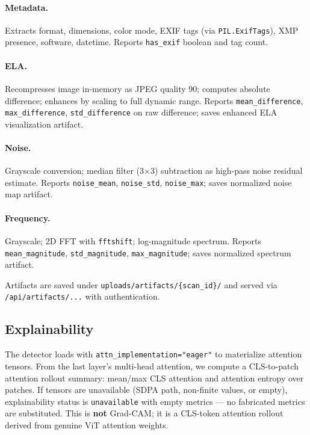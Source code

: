 \documentclass[10pt,conference,compsoc]{IEEEtran}
\begin{document}
\paragraph{Metadata.} Extracts format, dimensions, color mode, EXIF tags (via \texttt{PIL.ExifTags}), XMP presence, software, datetime. Reports \texttt{has\_exif} boolean and tag count.

\paragraph{ELA.} Recompresses image in-memory as JPEG quality 90; computes absolute difference; enhances by scaling to full dynamic range. Reports \texttt{mean\_difference}, \texttt{max\_difference}, \texttt{std\_difference} on raw difference; saves enhanced ELA visualization artifact.

\paragraph{Noise.} Grayscale conversion; median filter (3$\times$3) subtraction as high-pass noise residual estimate. Reports \texttt{noise\_mean}, \texttt{noise\_std}, \texttt{noise\_max}; saves normalized noise map artifact.

\paragraph{Frequency.} Grayscale; 2D FFT with \texttt{fftshift}; log-magnitude spectrum. Reports \texttt{mean\_magnitude}, \texttt{std\_magnitude}, \texttt{max\_magnitude}; saves normalized spectrum artifact.

Artifacts are saved under \texttt{uploads/artifacts/\{scan\_id\}/} and served via \texttt{/api/artifacts/...} with authentication.

\subsection{Explainability}
\label{sec:explainability}

The detector loads with \texttt{attn\_implementation="eager"} to materialize attention tensors.
From the last layer's multi-head attention, we compute a CLS-to-patch attention rollout summary:
mean/max CLS attention and attention entropy over patches.
If tensors are unavailable (SDPA path, non-finite values, or empty), explainability status is \texttt{unavailable} with empty metrics — no fabricated metrics are substituted.
This is \textbf{not} Grad-CAM; it is a CLS-token attention rollout derived from genuine ViT attention weights.
\end{document}
